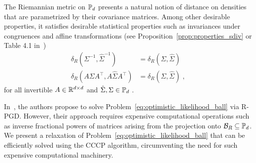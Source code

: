 \documentclass[sn-nature]{sn-jnl}%
\theoremstyle{thmstyleone}%
\theoremstyle{thmstyletwo}%
\theoremstyle{thmstylethree}%
\begin{document}
The Riemannian metric on $\mathbb{P}_d$ presents a natural notion of distance on densities that are parametrized by their covariance matrices. Among other desirable properties,  it satisfies desirable statistical properties such as invariances under congruences and affine transformations (see Proposition~\ref{prop:properties_sdiv} or Table 4.1 in~\cite{sra2013sdivergence}) 
\begin{equation}\label{eq:desirable_prop_Pd}
    \begin{aligned}
\delta_R\left(\Sigma^{-1}, \hat{\Sigma}^{-1}\right) &= \delta_R \left(\Sigma, \hat{\Sigma}\right) \\ \delta_R\left(A \Sigma A^{\top}, A \hat{\Sigma} A^{\top}\right)&=\delta_R\left(\Sigma, \hat{\Sigma}\right) \; ,
\end{aligned}
\end{equation}
for all invertible $A \in \mathbb{R}^{d \times d}$ and $\hat{\Sigma}, \Sigma \in \mathbb{P}_d$ \citep{riemanniangaussianSPD}.











In~\cite{Nguyen2019CalculatingOL}, the authors propose to solve Problem~\eqref{eq:optimistic_likelihood_ball} via R-PGD. 
However, their approach requires expensive computational operations such as inverse fractional powers of matrices arising from the projection onto $\mathcal{B}_R \subseteq \mathbb{P}_d$. We present a relaxation of Problem~\eqref{eq:optimistic_likelihood_ball} that can be efficiently solved using the CCCP algorithm, circumventing  the need for such expensive computational machinery. %
\end{document}

